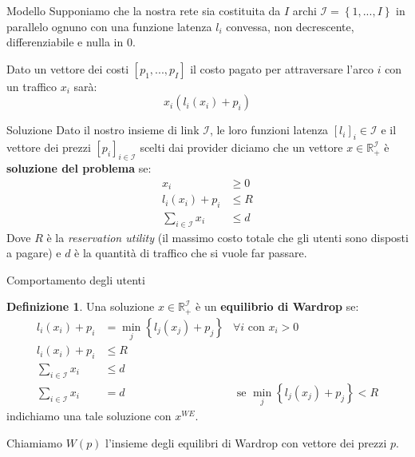 \documentclass{beamer}
\newcounter{counter1}
\theoremstyle{plain}
\theoremstyle{definition}
\newtheorem{mydef}[counter1]{Definizione}
\theoremstyle{remark}
\newcommand{\set}[1]{\left\{#1\right\}}
\newcommand{\pa}[1]{\left(#1\right)}
\newcommand{\bra}[1]{\left[#1\right]}
\begin{document}
\begin{frame}{Modello}
  Supponiamo che la nostra rete sia costituita da $I$ archi
  $\mathcal{I} = \set{1,...,I}$ in parallelo ognuno con una funzione
  latenza $l_i$ convessa, non decrescente, differenziabile e nulla in
  $0$.

  Dato un vettore dei costi $\bra{p_1,...,p_I}$ il costo pagato per
  attraversare l'arco $i$ con un traffico $x_i$ sarà:
  \[ x_i \pa{ l_i(x_i) + p_i} \]

  \begin{center}
  \end{center}
\end{frame}

\begin{frame}{Soluzione}
  Dato il nostro insieme di link $\mathcal{I}$, le loro funzioni
  latenza $\bra{l_i}_i\in\mathcal{I}$ e il vettore dei prezzi
  $\bra{p_i}_{i\in\mathcal{I}}$ scelti dai provider diciamo che un
  vettore $x\in \mathbb{R}_+^\mathcal{I}$ è \textbf{soluzione del
    problema} se:
  \begin{align*}
    x_i & \ge 0 \\
    l_i(x_i) + p_i &\le R \\
    \sum _{i\in \mathcal{I}} x_i &\le d 
  \end{align*}
  Dove $R$ è la \textit{reservation utility} (il massimo costo totale
  che gli utenti sono disposti a pagare) e $d$ è la quantità di
  traffico che si vuole far passare.
\end{frame}

\begin{frame}{Comportamento degli utenti}
  \begin{mydef}
    Una soluzione $x\in \mathbb{R}_+^\mathcal{I}$ è un
    \textbf{equilibrio di Wardrop} se:
    \begin{align*}
      l_i(x_i) + p_i &= \min _j \set{l_j(x_j)+p_j} & \forall i\text{ con } x_i>0 \\
      l_i(x_i) + p_i &\le R \\
      \sum _{i\in \mathcal{I}} x_i &\le d \\
      \sum _{i\in \mathcal{I}} x_i &= d & \text { se } \min _j
                                          \set{l_j(x_j)+p_j} <R
    \end{align*}
    indichiamo una tale soluzione con $x^{WE}$.
  \end{mydef}
  Chiamiamo $W(p)$ l'insieme degli equilibri di Wardrop con vettore
  dei prezzi $p$.
\end{frame}
\end{document}
